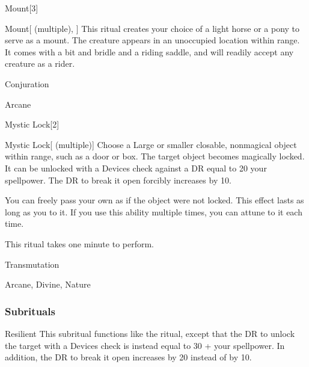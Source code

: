 \begin{spellsection}{Mount}[3]


\begin{ability}{Mount}[ (multiple), ]
This ritual creates your choice of a light horse or a pony to serve as a mount.
The creature appears in an unoccupied location within \rngclose range.
It comes with a bit and bridle and a riding saddle, and will readily accept any creature as a rider.
\end{ability}




 Conjuration

 Arcane
\end{spellsection}


\begin{spellsection}{Mystic Lock}[2]


\begin{ability}{Mystic Lock}[ (multiple)]
Choose a Large or smaller closable, nonmagical object within \rngclose range, such as a door or box.
The target object becomes magically locked.
It can be unlocked with a Devices check against a DR equal to 20 \add your spellpower.
The DR to break it open forcibly increases by 10.

You can freely pass your own  as if the object were not locked.
This effect lasts as long as you  to it.
If you use this ability multiple times, you can attune to it each time.

This ritual takes one minute to perform.
\end{ability}




 Transmutation

 Arcane, Divine, Nature
\end{spellsection}


\subsubsection{Subrituals}


\begin{ability}[\nth{5}]{Resilient}
This subritual functions like the  ritual, except that the DR to unlock the target with a Devices check is instead equal to 30 + your spellpower.
In addition, the DR to break it open increases by 20 instead of by 10.
\end{ability}
\vspace{0.25em}


